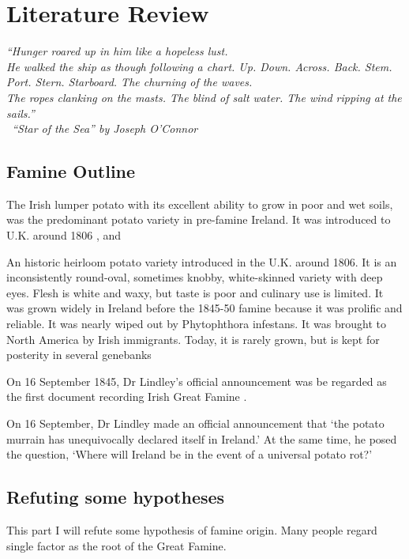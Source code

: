 \chapter{Literature Review}

\textit{``Hunger roared up in him like a hopeless lust.\\ 
He walked the ship as though following a chart. Up. Down. Across. Back. Stem. Port. Stern. Starboard. The churning of the waves. \\
The ropes clanking on the masts. The blind of salt water. The wind ripping at the sails.''\\
\textemdash\ ``Star of the Sea'' by Joseph O'Connor}
\vspace{.2cm}

\section{Famine Outline}

The Irish lumper potato with its excellent ability to grow in poor and wet soils, was the predominant potato variety in pre-famine Ireland. It was introduced to U.K. around 1806 \citep{tucker2016potato}, and 


An historic heirloom potato variety introduced in the U.K. around 1806. It is an
inconsistently round-oval, sometimes knobby, white-skinned variety with deep eyes. Flesh
is white and waxy, but taste is poor and culinary use is limited. It was grown widely in
Ireland before the 1845-50 famine because it was prolific and reliable. It was nearly
wiped out by Phytophthora infestans. It was brought to North America by Irish
immigrants. Today, it is rarely grown, but is kept for posterity in several genebanks

On 16 September 1845, Dr Lindley's official announcement was be regarded as the first document recording Irish Great Famine \citep{kelly1995great}.

On 16 September, Dr Lindley made an official announcement
that ‘the potato murrain has unequivocally declared itself in Ireland.’ At the same
time, he posed the question, ‘Where will Ireland be in the event of a universal potato
rot?’



\section{Refuting some hypotheses}

This part I will refute some hypothesis of famine origin. Many people regard single factor as the root of the Great Famine.


